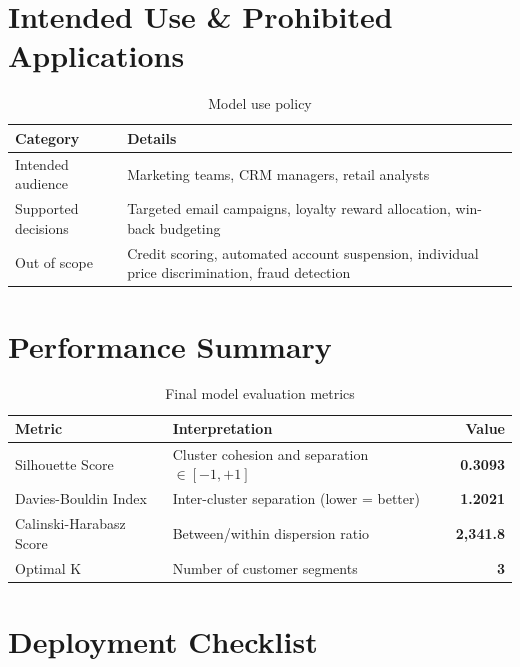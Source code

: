 \documentclass[12pt,a4paper]{report}
\begin{document}
\section{Intended Use \& Prohibited Applications}

\begin{table}[H]
\centering
\caption{Model use policy}
\begin{tabularx}{\textwidth}{lX}
\toprule
\textbf{Category} & \textbf{Details} \\
\midrule
Intended audience & Marketing teams, CRM managers, retail analysts \\
Supported decisions & Targeted email campaigns, loyalty reward allocation, win-back budgeting \\
Out of scope & Credit scoring, automated account suspension, individual price discrimination, fraud detection \\
\bottomrule
\end{tabularx}
\end{table}

\section{Performance Summary}

\begin{table}[H]
\centering
\caption{Final model evaluation metrics}
\begin{tabular}{llr}
\toprule
\textbf{Metric} & \textbf{Interpretation} & \textbf{Value} \\
\midrule
Silhouette Score & Cluster cohesion and separation $\in [-1,+1]$ & \textbf{0.3093} \\
Davies-Bouldin Index & Inter-cluster separation (lower = better) & \textbf{1.2021} \\
Calinski-Harabasz Score & Between/within dispersion ratio & \textbf{2,341.8} \\
Optimal K & Number of customer segments & \textbf{3} \\
\bottomrule
\end{tabular}
\end{table}

\section{Deployment Checklist}
\end{document}

